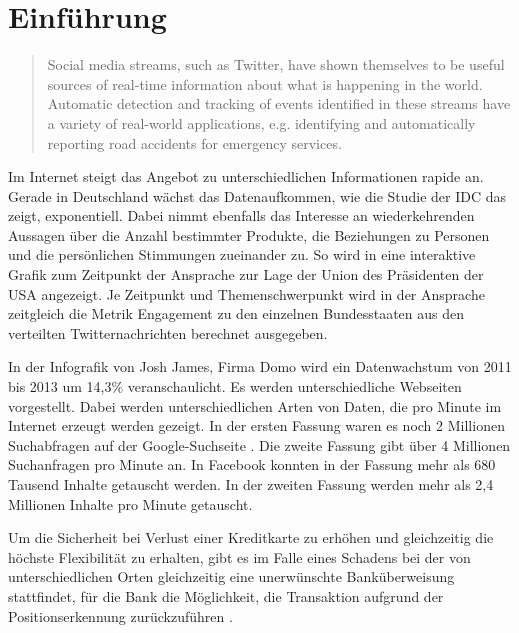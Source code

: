 \chapter{Einführung}

\begin{quote}
Social media streams, such as Twitter, have shown themselves to be useful sources of real-time information about what is happening in the world. Automatic detection and tracking of events identified in these streams have a variety of real-world applications, e.g. identifying and automatically reporting road accidents for emergency services.
\end{quote}

Im Internet steigt das Angebot zu unterschiedlichen Informationen rapide an. Gerade in Deutschland wächst das Datenaufkommen, wie die Studie der IDC  das zeigt, exponentiell. Dabei nimmt ebenfalls das Interesse an wiederkehrenden Aussagen über die Anzahl bestimmter Produkte, die Beziehungen zu Personen und die persönlichen Stimmungen zueinander zu. So wird in  eine interaktive Grafik zum Zeitpunkt der Ansprache zur Lage der Union des Präsidenten der USA angezeigt. Je Zeitpunkt und Themenschwerpunkt wird in der Ansprache zeitgleich die Metrik Engagement zu den einzelnen Bundesstaaten aus den verteilten Twitternachrichten berechnet ausgegeben.
%

In der Infografik  von Josh James, Firma Domo wird ein Datenwachstum von 2011 bis 2013 um 14,3\% veranschaulicht. Es werden unterschiedliche Webseiten vorgestellt. Dabei werden unterschiedlichen Arten von Daten, die pro Minute im Internet erzeugt werden gezeigt. 
In der ersten Fassung  waren es noch 2 Millionen Suchabfragen auf der Google-Suchseite . Die zweite Fassung gibt über 4 Millionen Suchanfragen pro Minute an. In Facebook  konnten in der Fassung mehr als 680 Tausend Inhalte getauscht werden. In der zweiten Fassung werden mehr als 2,4 Millionen Inhalte pro Minute getauscht. 

Um die Sicherheit bei Verlust einer Kreditkarte zu erhöhen und gleichzeitig die höchste Flexibilität zu erhalten, gibt es im Falle eines Schadens bei der von unterschiedlichen Orten gleichzeitig eine unerwünschte Banküberweisung stattfindet, für die Bank die Möglichkeit, die Transaktion aufgrund der Positionserkennung zurückzuführen .

